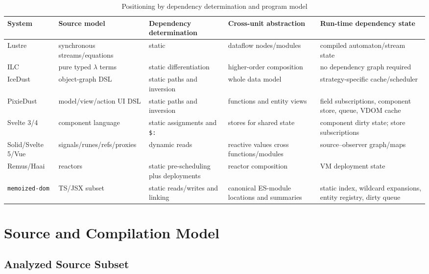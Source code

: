 \documentclass[conference]{IEEEtran}
\begin{document}
\begin{table}[t]
\centering
\caption{Positioning by dependency determination and program model}
\label{tab:positioning}
\begin{tabular}{@{}p{2.4cm}p{3.0cm}p{3.0cm}p{3.5cm}p{3.5cm}@{}}
\toprule
\textbf{System} & \textbf{Source model} & \textbf{Dependency determination} & \textbf{Cross-unit abstraction} & \textbf{Run-time dependency state} \\
\midrule
Lustre & synchronous streams/equations & static & dataflow nodes/modules & compiled automaton/stream state \\
ILC & pure typed $\lambda$ terms & static differentiation & higher-order composition & no dependency graph required \\
IceDust & object-graph DSL & static paths and inversion & whole data model & strategy-specific cache/scheduler \\
PixieDust & model/view/action UI DSL & static paths and inversion & functions and entity views & field subscriptions, component store, queue, VDOM cache \\
Svelte 3/4 & component language & static assignments and \texttt{\$:} & stores for shared state & component dirty state; store subscriptions \\
Solid/Svelte 5/Vue & signals/runes/refs/proxies & dynamic reads & reactive values cross functions/modules & source--observer graph/maps \\
Remus/Haai & reactors & static pre-scheduling plus deployments & reactor composition & VM deployment state \\
\texttt{memoized-dom} & TS/JSX subset & static reads/writes and linking & canonical ES-module locations and summaries & static index, wildcard expansions, entity registry, dirty queue \\
\bottomrule
\end{tabular}
\end{table}

\section{Source and Compilation Model}
\label{sec:source}

\subsection{Analyzed Source Subset}
\end{document}
